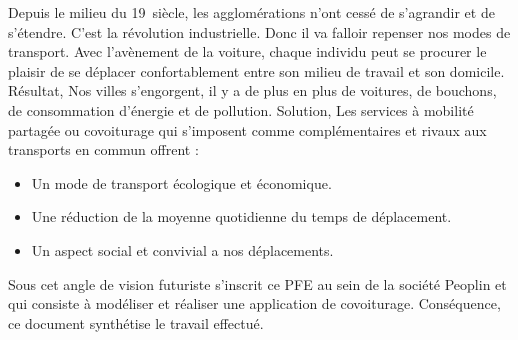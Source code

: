 
\begin{general}

\hspace{1cm}Depuis le milieu du 19\ieme\ siècle, les agglomérations n’ont cessé de s’agrandir et de s’étendre. C’est la révolution industrielle. Donc il va falloir repenser nos modes de transport.\newline
Avec l’avènement de la voiture, chaque individu peut se procurer le plaisir de se déplacer confortablement entre son milieu de travail et son domicile.\newline
Résultat, Nos villes s’engorgent, il y a de plus en plus de voitures, de bouchons, de consommation d’énergie et de pollution.\newline
Solution, Les services à mobilité partagée ou covoiturage qui s’imposent comme complémentaires et rivaux aux transports en commun offrent :
\begin{itemize}
\item Un mode de transport écologique et économique.
\item Une réduction de la moyenne quotidienne du temps de déplacement.
\item Un aspect social et convivial a nos déplacements.
\end{itemize}
Sous cet angle de vision futuriste s’inscrit ce PFE au sein de la société Peoplin et qui consiste à modéliser et réaliser une application de covoiturage.\newline
Conséquence, ce document synthétise le travail effectué.

\end{general}
